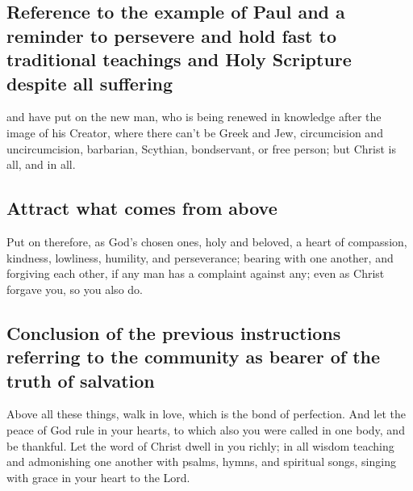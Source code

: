 \hypertarget{reference-to-the-example-of-paul-and-a-reminder-to-persevere-and-hold-fast-to-traditional-teachings-and-holy-scripture-despite-all-suffering}{%
\subsection{Reference to the example of Paul and a reminder to persevere
and hold fast to traditional teachings and Holy Scripture despite all
suffering}\label{reference-to-the-example-of-paul-and-a-reminder-to-persevere-and-hold-fast-to-traditional-teachings-and-holy-scripture-despite-all-suffering}}

 and have put on the new man, who is being renewed in
knowledge after the image of his Creator,  where there
can't be Greek and Jew, circumcision and uncircumcision, barbarian,
Scythian, bondservant, or free person; but Christ is all, and in all.

\hypertarget{attract-what-comes-from-above}{%
\subsection{Attract what comes from
above}\label{attract-what-comes-from-above}}

 Put on therefore, as God's chosen ones, holy and
beloved, a heart of compassion, kindness, lowliness, humility, and
perseverance;  bearing with one another, and forgiving
each other, if any man has a complaint against any; even as Christ
forgave you, so you also do.

\hypertarget{conclusion-of-the-previous-instructions-referring-to-the-community-as-bearer-of-the-truth-of-salvation}{%
\subsection{Conclusion of the previous instructions referring to the
community as bearer of the truth of
salvation}\label{conclusion-of-the-previous-instructions-referring-to-the-community-as-bearer-of-the-truth-of-salvation}}

 Above all these things, walk in love, which is the bond
of perfection.  And let the peace of God rule in your
hearts, to which also you were called in one body, and be thankful.
 Let the word of Christ dwell in you richly; in all
wisdom teaching and admonishing one another with psalms, hymns, and
spiritual songs, singing with grace in your heart to the Lord.

